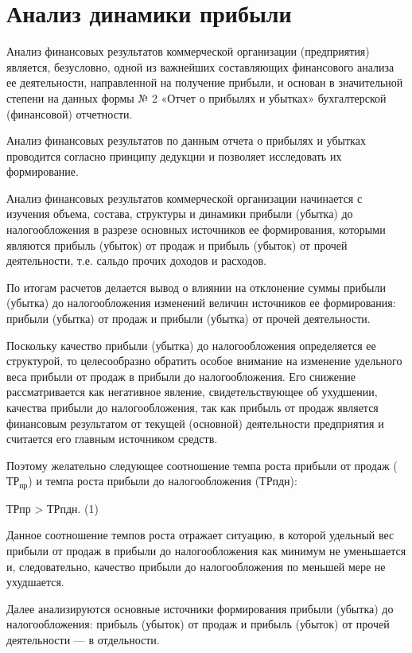 \section{Анализ динамики прибыли}

Анализ финансовых результатов коммерческой организации (предприятия) является, безусловно, одной из важнейших составляющих финансового анализа ее деятельности, направленной на получение прибыли, и основан в значительной степени на данных формы № 2 «Отчет о прибылях и убытках» бухгалтерской (финансовой) отчетности.

Анализ финансовых результатов по данным отчета о прибылях и убытках проводится согласно принципу дедукции и позволяет исследовать их формирование.

Анализ финансовых результатов коммерческой организации начинается с изучения объема, состава, структуры и динамики прибыли (убытка) до налогообложения в разрезе основных источников ее формирования, которыми являются прибыль (убыток) от продаж и прибыль (убыток) от прочей деятельности, т.е. сальдо прочих доходов и расходов.

По итогам расчетов делается вывод о влиянии на отклонение суммы прибыли (убытка) до налогообложения изменений величин источников ее формирования: прибыли (убытка) от продаж и прибыли (убытка) от прочей деятельности.

Поскольку качество прибыли (убытка) до налогообложения определяется ее структурой, то целесообразно обратить особое внимание на изменение удельного веса прибыли от продаж в прибыли до налогообложения. Его снижение рассматривается как негативное явление, свидетельствующее об ухудшении, качества прибыли до налогообложения, так как прибыль от продаж является финансовым результатом от текущей (основной) деятельности предприятия и считается его главным источником средств.

Поэтому желательно следующее соотношение темпа роста прибыли от продаж ($\text{ТР}_{\text{пр}}$) и темпа роста прибыли до налогообложения (ТРпдн):

ТРпр > ТРпдн.        (1)

Данное соотношение темпов роста отражает ситуацию, в которой удельный вес прибыли от продаж в прибыли до налогообложения как минимум не уменьшается и, следовательно, качество прибыли до налогообложения по меньшей мере не ухудшается.

Далее анализируются основные источники формирования прибыли (убытка) до налогообложения: прибыль (убыток) от продаж и прибыль (убыток) от прочей деятельности — в отдельности.

